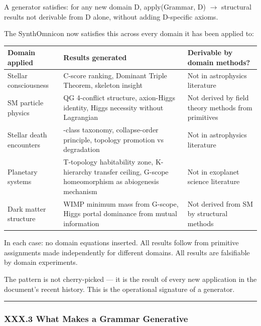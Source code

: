 \documentclass[12pt,a4paper]{article}
\begin{document}
A generator satisfies: for any new domain D, apply(Grammar, D) $\rightarrow$ structural results not derivable from D alone, without adding D-specific axioms.

The SynthOmnicon now satisfies this across every domain it has been applied to:

\begin{table}[htbp]
\centering
\small
{}
\begin{tabularx}{\textwidth}{>{\centering\arraybackslash}X >{\centering\arraybackslash}X >{\centering\arraybackslash}X}
\toprule
\rowcolor{gray!25}\textbf{Domain applied} & \textbf{Results generated} & \textbf{Derivable by domain methods?} \\
\midrule
\rowcolors{1}{white}{gray!10}
Stellar consciousness & C-score ranking, Dominant Triple Theorem, skeleton insight & Not in astrophysics literature \\
SM particle physics & QG 4-conflict structure, axion-Higgs identity, Higgs necessity without Lagrangian & Not derived by field theory methods from primitives \\
Stellar death encounters & 6-class taxonomy, collapse-order principle, topology promotion vs degradation & Not in astrophysics literature \\
Planetary systems & T-topology habitability zone, K-hierarchy transfer ceiling, G-scope homeomorphism as abiogenesis mechanism & Not in exoplanet science literature \\
Dark matter structure & WIMP minimum mass from G-scope, Higgs portal dominance from mutual information & Not derived from SM by structural methods \\
\bottomrule
\end{tabularx}
\end{table}

In each case: no domain equations inserted. All results follow from primitive assignments made independently for different domains. All results are falsifiable by domain experiments.

The pattern is not cherry-picked --- it is the result of every new application in the document's recent history. This is the operational signature of a generator.

\begin{center}
\rule{0.5\textwidth}{0.4pt}
\end{center}

\subsubsection{XXX.3 What Makes a Grammar Generative}
\end{document}
